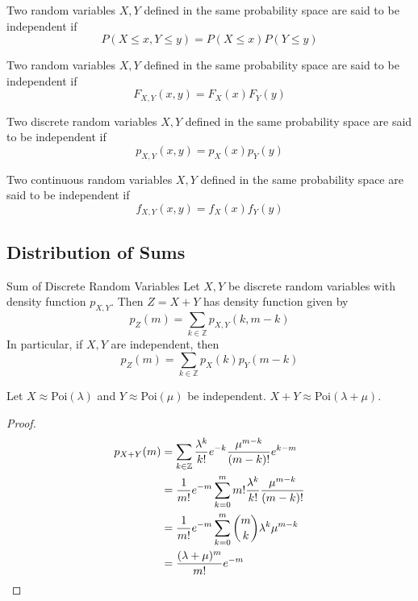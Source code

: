\documentclass[a4paper]{article}
\begin{document}
\begin{defn}{}{} Two random variables $X,Y$ defined in the same probability space are said to be independent if $$P(X\leq x, Y\leq y)=P(X\leq x)P(Y\leq y)$$
\end{defn}

\begin{thm}{}{} Two random variables $X,Y$ defined in the same probability space are said to be independent if $$F_{X,Y}(x,y)=F_X(x)F_Y(y)$$
\end{thm}

\begin{thm}{}{} Two discrete random variables $X,Y$ defined in the same probability space are said to be independent if $$p_{X,Y}(x,y)=p_X(x)p_Y(y)$$
\end{thm}

\begin{thm}{}{} Two continuous random variables $X,Y$ defined in the same probability space are said to be independent if $$f_{X,Y}(x,y)=f_X(x)f_Y(y)$$
\end{thm}

\subsection{Distribution of Sums}
\begin{thm}{Sum of Discrete Random Variables}{} Let $X,Y$ be discrete random variables with density function $p_{X,Y}$. Then $Z=X+Y$ has density function given by $$p_Z(m)=\sum_{k\in\mathbb{Z}}p_{X,Y}(k,m-k)$$ In particular, if $X,Y$ are independent, then $$p_Z(m)=\sum_{k\in\mathbb{Z}}p_X(k)p_Y(m-k)$$
\end{thm}

\begin{prp}{}{} Let $X\approx$Poi$(\lambda)$ and $Y\approx$Poi$(\mu)$ be independent. $X+Y\approx$Poi$(\lambda+\mu)$. 
\end{prp}
\begin{proof} 
\begin{align*}
p_{X+Y}(m)&=\sum_{k\in\mathbb{Z}}\frac{\lambda^k}{k!}e^{-k}\frac{\mu^{m-k}}{(m-k)!}e^{k-m}\\
&=\frac{1}{m!}e^{-m}\sum_{k=0}^mm!\frac{\lambda^k}{k!}\frac{\mu^{m-k}}{(m-k)!}\\
&=\frac{1}{m!}e^{-m}\sum_{k=0}^m\binom{m}{k}\lambda^k\mu^{m-k}\\
&=\frac{(\lambda+\mu)^m}{m!}e^{-m}
\end{align*}
\end{proof}
\end{document}
